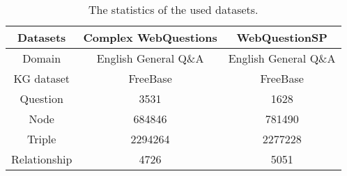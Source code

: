 \begin{table*}[htbp]
  \centering
  \normalsize
  \caption{The statistics of the used datasets.}
  \label{tabel:introduce}
  \renewcommand{\arraystretch}{1.2} %
  \setlength{\tabcolsep}{12pt} %
  \begin{tabular}{c c c}  %
    \toprule
    \textbf{Datasets} & \textbf{Complex WebQuestions} & \textbf{WebQuestionSP} \\
    \midrule
    Domain & English General Q\&A & English General Q\&A\\  %
    KG dataset & FreeBase & FreeBase\\  %
    Question & 3531 & 1628 \\
    Node & 684846 & 781490 \\
    Triple & 2294264 & 2277228 \\
    Relationship & 4726 & 5051 \\
    \bottomrule
  \end{tabular}
\end{table*}
